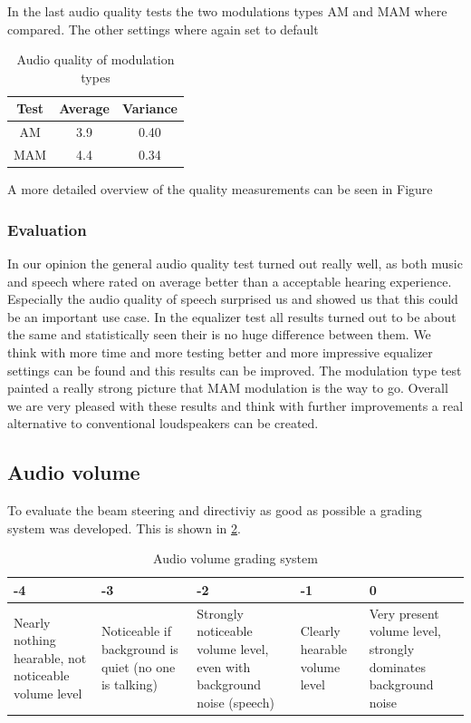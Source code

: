 \begin{enumerate}
    In the last audio quality tests the two modulations types AM and MAM where compared. The other settings where again set to default
    \begin{center}
     \begin{table}[h!]
    \centering
    \begin{tabular}{ |c|c|c|}
      \hline 
      Test & Average & Variance \\ 
      \hline
     AM & 3.9 & 0.40 \\
     \hline
     MAM & 4.4 & 0.34 \\
     \hline
    \end{tabular}
    \caption{Audio quality of modulation types}
    \label{6.1.2_tab:music_audio_quality_mod}
    \end{table}   
    \end{center}
\end{enumerate}
A more detailed overview of the quality measurements can be seen in Figure 
\subsubsection{Evaluation}
In our opinion the general audio quality test turned out really well, as both music and speech where rated on average better than a acceptable hearing experience. Especially the audio quality of speech surprised us and showed us that this could be an important use case. In the equalizer test all results turned out to be about the same and statistically seen their is no huge difference between them. We think with more time and more testing better and more impressive equalizer settings can be found and this results can be improved. The modulation type test painted a really strong picture that MAM modulation is the way to go. 
Overall we are very pleased with these results and think with further improvements a real alternative to conventional loudspeakers can be created. 
\subsection{Audio volume}
To evaluate the beam steering and directiviy as good as possible a grading system was developed. This is shown in \ref{6.1.3_tab:audio_volume}.

\begin{center}
\begin{table}
\centering
\begin{tabular}{ |m{2.2cm}|m{2.2cm}|m{2.2cm}|m{2.2cm}|m{2.2cm}|}
  \hline 
  -4 & -3 & -2 & -1 & 0\\ 
  \hline
Nearly nothing hearable, not noticeable volume level &	Noticeable if background is quiet (no one is talking) &	Strongly noticeable volume level, even with background noise (speech) &	Clearly hearable volume level & Very present volume level, strongly dominates background noise
\\
 \hline
\end{tabular}
\caption{Audio volume grading system}
\label{6.1.3_tab:audio_volume}
\end{table}
\end{center}
